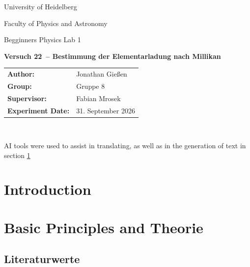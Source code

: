 \documentclass[12pt,a4paper,titlepage]{scrartcl}
\numberwithin{equation}{section}
\numberwithin{table}{section}
\numberwithin{figure}{section}
\newcommand{\versuch}{Versuch 22}
\newcommand{\titel}{Bestimmung der Elementarladung nach Millikan}
\newcommand{\praktikum}{Begginners Physics Lab 1}
\newcommand{\autor}{Jonathan Gießen}
\newcommand{\gruppe}{Gruppe 8}
\newcommand{\datum}{31. September 2026}
\newcommand{\betreuer}{Fabian Mrosek}
\begin{document}
\pagestyle{scrheadings}

\begin{titlepage}



    \centering
    \vspace*{4cm}
    {\large University of Heidelberg\par}
    {\small Faculty of Physics and Astronomy\par}
    {\Large \praktikum\par}
    \vspace{0.8cm}
    {\LARGE \bfseries \versuch\ -- \titel\par}
    \vspace{1.5cm}

    \begin{tabular}{ll}
        \textbf{Author:} & \autor\\
        \textbf{Group:} & \gruppe\\
        \textbf{Supervisor:} & \betreuer\\
        \textbf{Experiment Date:} & \datum\\
    \end{tabular}

    \vfill
    \hrulefill\
\end{titlepage}

\tableofcontents

\bigskip
\begin{tcolorbox}[colback=gray!5,colframe=gray!60,boxrule=0.8pt,arc=0.01mm,title=AI-Disclaimer]
    AI tools were used to assist in translating, as well as in the generation of text in section \ref{sec:Einleitung}
\end{tcolorbox}

\clearpage



\section{Introduction}\label{sec:Einleitung}



\section{Basic Principles and Theorie}\label{sec:Grundlagen}


\subsection{Literaturwerte}
\end{document}
